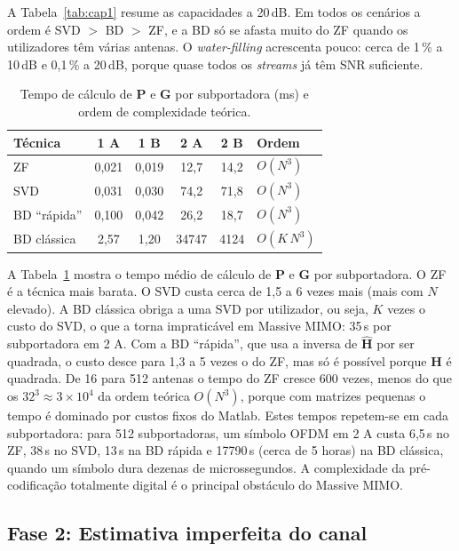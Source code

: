 A Tabela~\ref{tab:cap1} resume as capacidades a 20\,dB. Em todos os cenários a ordem é SVD $>$ BD $>$ ZF, e a BD só se afasta muito do ZF quando os utilizadores têm várias antenas. O \emph{water-filling} acrescenta pouco: cerca de 1\,\% a 10\,dB e 0,1\,\% a 20\,dB, porque quase todos os \emph{streams} já têm SNR suficiente.

\begin{table}[H]
  \centering
  \caption{Tempo de cálculo de $\mathbf{P}$ e $\mathbf{G}$ por subportadora (ms) e ordem de complexidade teórica.}
  \label{tab:compl}
  \begin{tabular}{@{}lccccl@{}}
    \toprule
    Técnica & 1 A & 1 B & 2 A & 2 B & Ordem \\
    \midrule
    ZF & 0,021 & 0,019 & 12,7 & 14,2 & $O(N^3)$ \\
    SVD & 0,031 & 0,030 & 74,2 & 71,8 & $O(N^3)$ \\
    BD ``rápida'' & 0,100 & 0,042 & 26,2 & 18,7 & $O(N^3)$ \\
    BD clássica & 2,57 & 1,20 & 34747 & 4124 & $O(K\,N^3)$ \\
    \bottomrule
  \end{tabular}
\end{table}

A Tabela~\ref{tab:compl} mostra o tempo médio de cálculo de $\mathbf{P}$ e $\mathbf{G}$ por subportadora. O ZF é a técnica mais barata. O SVD custa cerca de 1,5 a 6 vezes mais (mais com $N$ elevado). A BD clássica obriga a uma SVD por utilizador, ou seja, $K$ vezes o custo do SVD, o que a torna impraticável em Massive MIMO: 35\,s por subportadora em 2 A. Com a BD ``rápida'', que usa a inversa de $\hat{\mathbf{H}}$ por ser quadrada, o custo desce para 1,3 a 5 vezes o do ZF, mas só é possível porque $\mathbf{H}$ é quadrada. De 16 para 512 antenas o tempo do ZF cresce 600 vezes, menos do que os $32^3\approx3\times10^4$ da ordem teórica $O(N^3)$, porque com matrizes pequenas o tempo é dominado por custos fixos do Matlab. Estes tempos repetem-se em cada subportadora: para 512 subportadoras, um símbolo OFDM em 2 A custa 6,5\,s no ZF, 38\,s no SVD, 13\,s na BD rápida e 17790\,s (cerca de 5 horas) na BD clássica, quando um símbolo dura dezenas de microssegundos. A complexidade da pré-codificação totalmente digital é o principal obstáculo do Massive MIMO.

\subsection{Fase 2: Estimativa imperfeita do canal}
\label{sec:fase2}

